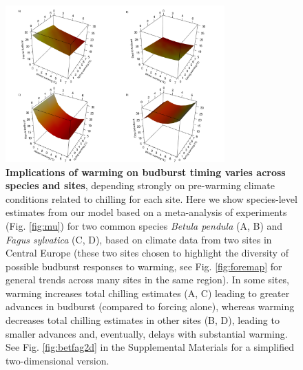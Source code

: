 \documentclass{article}
\newcommand{\R}[1]{\label{#1}\linelabel{#1}}
\begin{document}
\begin{figure}[h!]
\centering
\noindent \includegraphics[width=0.75\textwidth]{..//..//analyses/bb_analysis/figures/forecasting/tempforecastbothspp_1_7_degwarm3D_utah.png}
\caption{\textbf{Implications of warming on budburst timing varies across species and sites}, depending strongly on pre-warming climate conditions related to chilling for each site. Here we show species-level estimates from our model based on a meta-analysis of experiments\R{ee14} (Fig. \ref{fig:mu}) for two common species \emph{Betula pendula} (A, B) and \emph{Fagus sylvatica} (C, D), based on climate data from two sites in Central Europe (these two sites chosen to highlight the diversity of possible budburst responses to warming, see Fig. \ref{fig:foremap} for general trends across many sites in the same region). In some sites, warming increases total chilling estimates (A, C) leading to greater advances in budburst (compared to forcing alone), whereas warming decreases total chilling estimates in other sites (B, D), leading to smaller advances and, eventually, delays with substantial warming. See Fig. \ref{fig:betfag2d} in the Supplemental Materials for a simplified two-dimensional version.}
\label{fig:betfag3d}
\end{figure}

\end{document}
